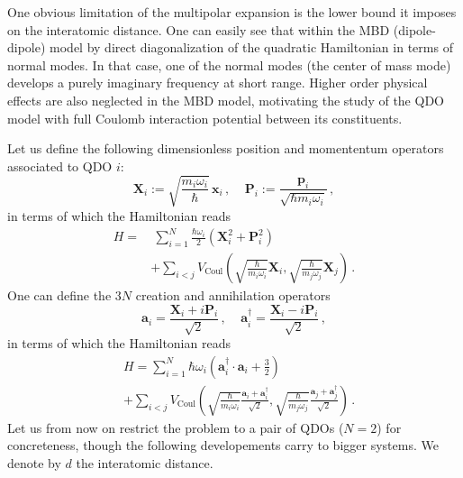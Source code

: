 \documentclass[reprint, amsmath, amssymb, floatfix, aps, pra]{revtex4-2}
\begin{document}
        One obvious limitation of the multipolar expansion is the lower bound it imposes on the interatomic distance. One can easily see that within the MBD (dipole-dipole) model by direct diagonalization of the quadratic Hamiltonian in terms of normal modes. In that case, one of the normal modes (the center of mass mode) develops a purely imaginary frequency at short range. Higher order physical effects are also neglected in the MBD model, motivating the study of the QDO model with full Coulomb interaction potential between its constituents.

        Let us define the following dimensionless position and momententum operators associated to QDO $i$:
        \begin{equation*}
            \bm{X}_i := \sqrt{\frac{m_i\omega_i}{\hbar}}\,\bm{x}_i\,,\ \ \ \ \ \bm{P}_i := \frac{\bm{p}_i}{\sqrt{\hbar m_i\omega_i}}\,,
        \end{equation*}
        in terms of which the Hamiltonian reads
        \begin{equation*}
        \begin{split}
            H =&\ \sum_{i=1}^N\frac{\hbar\omega_i}{2}\left(\bm X_{i}^2 + \bm P_{i}^2\right) \\
            & + \sum_{i<j}V_\text{Coul}\left(\sqrt{\frac{\hbar}{m_i\omega_i}}\bm{X} _i, \sqrt{\frac{\hbar}{m_j\omega_j}}\bm{X} _j\right)\,.
        \end{split}
        \end{equation*}
        One can define the $3N$ creation and annihilation operators
        \begin{equation*}
            \bm a_{i} = \frac{\bm X_{i} + i\bm P_{i}}{\sqrt 2}\,,\ \ \ \ \ \bm a^\dagger_{i} = \frac{\bm X_{i} - i\bm P_{i}}{\sqrt 2}\,,
        \end{equation*}
        in terms of which the Hamiltonian reads
        \begin{equation*}
        \begin{split}
            &H = \sum_{i=1}^N\hbar\omega_i\left(\bm a_{i}^\dagger\cdot\bm a_{i} +\frac{3}{2}\right) \\
            & + \sum_{i<j}V_\text{Coul}\left(\sqrt{\frac{\hbar}{m_i\omega_i}}\frac{\bm a_i + \bm a_i^\dagger}{\sqrt 2}, \sqrt{\frac{\hbar}{m_j\omega_j}}\frac{\bm a_j + \bm a_j^\dagger}{\sqrt 2}\right)\,.
        \end{split}
        \end{equation*}
        Let us from now on restrict the problem to a pair of QDOs ($N=2$) for concreteness, though the following developements carry to bigger systems. We denote by $d$ the interatomic distance.
\end{document}
